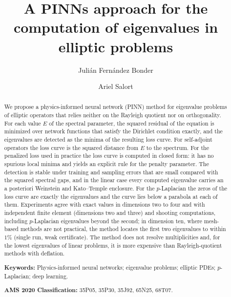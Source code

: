 \documentclass[10pt]{amsart}
\theoremstyle{definition}
\theoremstyle{remark}
\theoremstyle{plain}
\begin{document}
\title{A PINNs approach for the computation of eigenvalues in elliptic problems}

\author{Juli\'an Fern\'andez Bonder}
\address{Departamento de Matem\'atica, Facultad de Ciencias Exactas y Naturales, Universidad de Buenos Aires, Buenos Aires, Argentina, and Instituto de C\'alculo UBA-CONICET, Buenos Aires, Argentina}

\author{Ariel Salort}
\address{Departamento de Matem\'aticas Aplicadas y Ciencia de Datos, Universidad San Pablo-CEU, CEU Universities, Juli\'an Romea 2, 28003 Madrid, Spain}


\begin{abstract}
We propose a physics-informed neural network (PINN) method for eigenvalue problems of elliptic
operators that relies neither on the Rayleigh quotient nor on orthogonality. For each value $E$ of the
spectral parameter, the squared residual of the equation is minimized over network functions that
satisfy the Dirichlet condition exactly, and the eigenvalues are detected as the minima of the
resulting loss curve. For self-adjoint operators the loss curve is the squared distance from $E$ to
the spectrum. For the penalized loss used in practice the loss curve is computed in closed form: it
has no spurious local minima and yields an explicit rule for the penalty parameter. The detection is
stable under training and sampling errors that are small compared with the squared spectral gaps,
and in the linear case every computed eigenvalue carries an a posteriori Weinstein and Kato--Temple
enclosure. For the $p$-Laplacian the zeros of the loss curve are exactly the eigenvalues and the
curve lies below a parabola at each of them. Experiments agree with exact values in dimensions two to four and with independent finite element
(dimensions two and three) and shooting computations, including $p$-Laplacian
eigenvalues beyond the second; in dimension ten, where mesh-based methods are not practical, the
method locates the first two eigenvalues to within $1\%$ (single run, weak certificate). The method
does not resolve multiplicities and, for the lowest eigenvalues of linear problems, it is more
expensive than Rayleigh-quotient methods with deflation.

\medskip\noindent\textbf{Keywords:} Physics-informed neural networks; eigenvalue problems; elliptic
PDEs; $p$-Laplacian; deep learning.

\noindent\textbf{AMS 2020 Classification:} 35P05, 35P30, 35J92, 65N25, 68T07.
\end{abstract}
\end{document}
